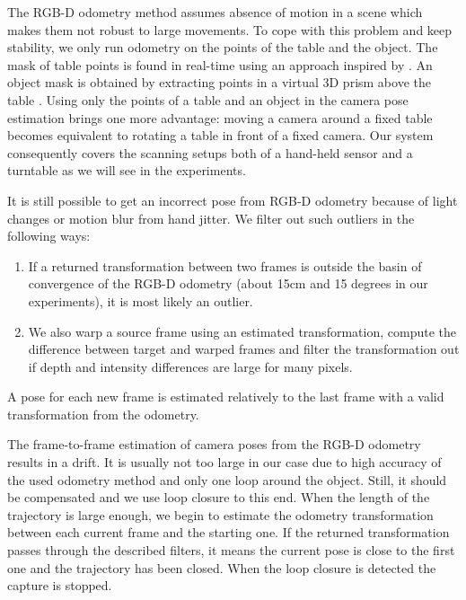 \documentclass[letterpaper, 10 pt, conference]{ieeeconf}  %
\begin{document}
The RGB-D odometry method assumes absence of motion in a scene which makes them not
robust to large movements. To cope with this problem and keep stability, we only run odometry
on the points of the table and the object. The mask of table points
is found in real-time using an approach inspired by \cite{poppinga2008fast}. An object mask is
obtained by extracting points in a virtual 3D prism above the table \cite{rusu2009detecting}.
Using only the points
of a table and an object in the camera pose estimation brings one more advantage:
moving a camera around a fixed table becomes equivalent to rotating
a table in front of a fixed camera. Our system consequently covers the scanning setups both of a hand-held sensor 
and a turntable as we will see in the experiments.

It is still possible to get an incorrect pose from RGB-D odometry
because of light changes or motion blur from hand jitter. We filter out such outliers in the following ways:

\begin{enumerate}
 \item If a returned transformation between two frames is outside the basin of convergence
 of the RGB-D odometry (about 15cm and 15 degrees in our experiments), it is most likely an outlier.
 \item We also warp a source frame using an estimated transformation,
 compute the difference between target and warped frames 
 and filter the transformation out if
 depth and intensity differences are large for many pixels.
\end{enumerate}

A pose for each new frame is estimated relatively to the last frame
with a valid transformation from the odometry.

The frame-to-frame estimation of camera poses from the RGB-D 
odometry results in a drift. It is usually not too large in our case
due to high accuracy of the used odometry method \cite{steinbrucker2011real}
and only one loop around the object.
Still, it should be compensated and we use loop closure to this end.
When the length of the trajectory is large enough, we begin to estimate the
odometry transformation between each current frame and the starting one. 
If the returned transformation passes through the described filters, 
it means the current pose is close to the first one and 
the trajectory has been closed. When the loop closure is detected 
the capture is stopped.
\end{document}
